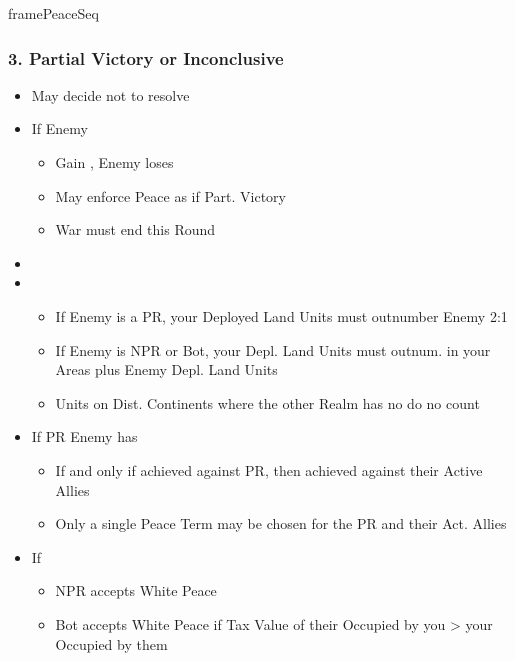 \documentclass[10pt]{article}
\newlength{\fhPeaceSeq} \setlength\fhPeaceSeq{26.5\baselineskip}
\begin{document}
\begin{dynamiccontents*}{framePeaceSeq}
\begin{eubox}{\fhPeaceSeq}
\begin{multicols}{3}
		\subsubsection*{3. Partial Victory or Inconclusive}
		\begin{itemize}
			\item May decide not to resolve
			\item If Enemy 
			\begin{itemize}
				\item Gain \p2, Enemy loses 
				\item May enforce Peace as if Part. Victory
				\item War must end this Round
			\end{itemize}
			\item {}
			\item {}
			\begin{itemize}
				\item If Enemy is a PR, your Deployed Land Units must outnumber Enemy 2:1
				\item If Enemy is NPR or Bot, your Depl. Land Units must outnum. \rebels in your Areas plus Enemy Depl. Land Units
				\item Units on Dist. Continents where the other Realm has no \towns do no count
			\end{itemize}
			\item If PR Enemy has 
			\begin{itemize}
				\item If and only if achieved against PR, then achieved against their Active Allies
				\item Only a single Peace Term may be chosen for the PR and their Act. Allies
			\end{itemize}
			\item If 
			\begin{itemize}
				\item NPR accepts White Peace
				\item Bot accepts White Peace if Tax Value of their \towns Occupied by you > your \towns Occupied by them
			\end{itemize}
		\end{itemize}


\end{multicols}
\end{eubox}
\end{dynamiccontents*}
\end{document}
